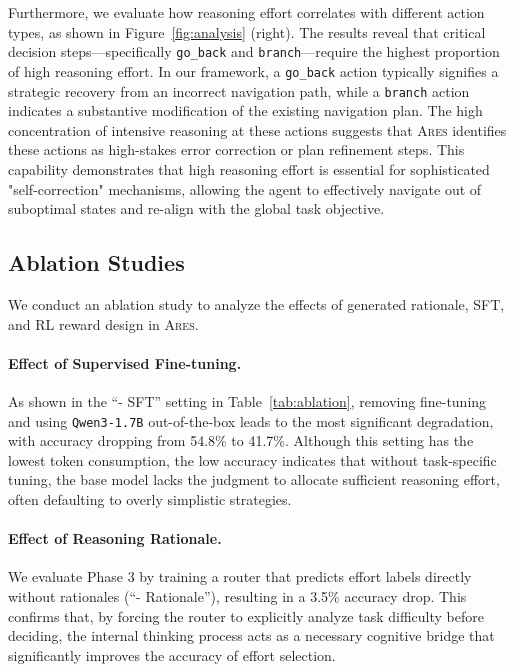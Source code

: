\documentclass{article}
\newcommand{\ares}{\textsc{Ares}}
\theoremstyle{plain}
\theoremstyle{definition}
\theoremstyle{remark}
\begin{document}
Furthermore, we evaluate how reasoning effort correlates with different action types, as shown in Figure~\ref{fig:analysis} (right). The results reveal that critical decision steps—specifically \texttt{go\_back} and \texttt{branch}—require the highest proportion of high reasoning effort. In our framework, a \texttt{go\_back} action typically signifies a strategic recovery from an incorrect navigation path, while a \texttt{branch} action indicates a substantive modification of the existing navigation plan. The high concentration of intensive reasoning at these actions suggests that {\ares} identifies these actions as high-stakes error correction or plan refinement steps. This capability demonstrates that high reasoning effort is essential for sophisticated "self-correction" mechanisms, allowing the agent to effectively navigate out of suboptimal states and re-align with the global task objective.



\subsection{Ablation Studies}
\label{subsec:ablation}
We conduct an ablation study to analyze the effects of generated rationale, SFT, and RL reward design in {\ares}. 



\paragraph{Effect of Supervised Fine-tuning.} 
As shown in the ``- SFT'' setting in Table~\ref{tab:ablation}, removing fine-tuning and using \texttt{Qwen3-1.7B} out-of-the-box leads to the most significant degradation, with accuracy dropping from 54.8\% to 41.7\%. Although this setting has the lowest token consumption, the low accuracy indicates that without task-specific tuning, the base model lacks the judgment to allocate sufficient reasoning effort, often defaulting to overly simplistic strategies.

\paragraph{Effect of Reasoning Rationale.} 
We evaluate Phase 3 by training a router that predicts effort labels directly without rationales (``- Rationale''), resulting in a 3.5\% accuracy drop. This confirms that, by forcing the router to explicitly analyze task difficulty before deciding, the internal thinking process acts as a necessary cognitive bridge that significantly improves the accuracy of effort selection.
\end{document}
